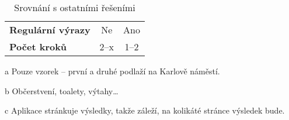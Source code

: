 \begin{table}
\begin{center}
\begin{threeparttable}
\begin{tabular}{|l|c|c|}
\textbf{Regulární výrazy} & Ne & Ano \\
\textbf{Počet kroků} & 2--x\tnote{c} & 1--2 \\
\hline
\end{tabular}
\begin{tablenotes}
\item[a] Pouze vzorek -- první a druhé podlaží na Karlově náměstí.
\item[b] Občerstvení, toalety, výtahy\dots
\item[c] Aplikace stránkuje výsledky, takže záleží, na kolikáté stránce výsledek bude.
\end{tablenotes}
\caption{Srovnání s ostatními řešeními}
\label{tab:srovnaniReseni}
\end{threeparttable}
\end{center}
\end{table}

